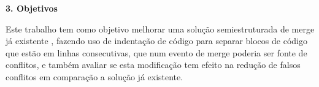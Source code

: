 \begin{flushleft}
	{\textbf{\Large{3. Objetivos}}}
\end{flushleft}
\vspace{1cm}

Este trabalho tem como objetivo melhorar uma solução semiestruturada de merge já existente \cite{clementino2021textual}, fazendo uso de indentação de código para separar blocos de código que estão em linhas consecutivas, que num evento de merge poderia ser fonte de conflitos, e também avaliar se esta modificação tem efeito na redução de falsos conflitos em comparação a solução já existente.

